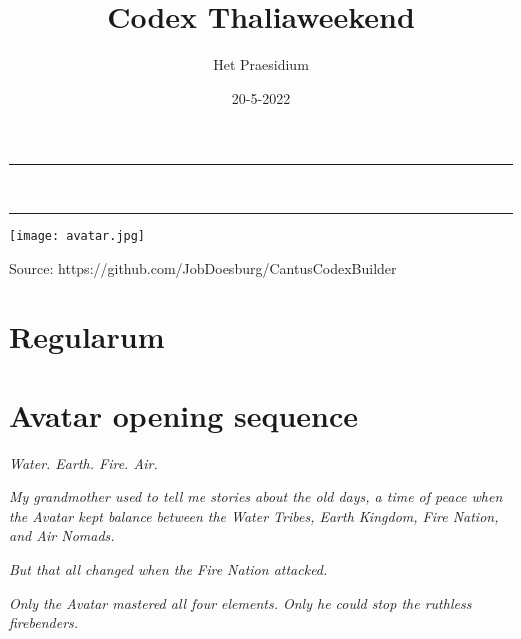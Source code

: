 \documentclass[10pt]{article}
\title{Codex Thaliaweekend}
\date{{20-5-2022}}
\author{Het Praesidium} %
\begin{document}
\titlespacing*{\section}{0pt}{3pt}{0pt}
\begin{titlepage}
\centering
\vspace*{0.5cm}
\hrule
\vspace{0.4cm}
{\LARGE \textsc{\thetitle}}\\[0.4cm]
\vspace{0.4cm}
\hrule
\vspace{15mm}

\texttt{[image: avatar.jpg]}  %


\vfill
\vspace{1.5cm}
{\Large \thedate}
\vspace{2cm}
\end{titlepage}
\thispagestyle{empty}

\newpage
\vspace{1cm}
\setcounter{secnumdepth}{-1}
\tableofcontents

{\footnotesize Source: https://github.com/JobDoesburg/CantusCodexBuilder}
\renewcommand{\baselinestretch}{1.0}\normalsize
\newpage

\section{Regularum}
\footnotesize

\vspace{1cm}
\newpage
\section{Avatar opening sequence}
\textit{Water. Earth. Fire. Air.}

\textit{My grandmother used to tell me stories about the old days, a time of peace when the Avatar kept balance between the Water Tribes, Earth Kingdom, Fire Nation, and Air Nomads.}

\textit{But that all changed when the Fire Nation attacked.}

\textit{Only the Avatar mastered all four elements. Only he could stop the ruthless firebenders.}
\end{document}
